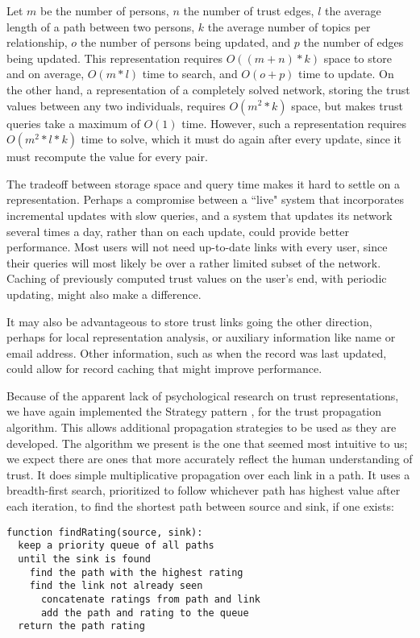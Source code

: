 \documentclass[letterpaper]{www2006-submission}
\begin{document}
Let $m$ be the number of persons, $n$ the number of trust edges, $l$ the average length of a path between two persons, $k$ the average number of topics per relationship, $o$ the number of persons being updated, and $p$ the number of edges being updated.  This representation requires $O((m+n)*k)$ space to store and on average, $O(m*l)$ time to search, and $O(o+p)$ time to update.  On the other hand, a representation of a completely solved network, storing the trust values between any two individuals, requires $O(m^2*k)$ space, but makes trust queries take a maximum of $O(1)$ time.  However, such a representation requires $O(m^2*l*k)$ time to solve, which it must do again after every update, since it must recompute the value for every pair.  

The tradeoff between storage space and query time makes it hard to settle on a representation.  Perhaps a compromise between a ``live" system that incorporates incremental updates with slow queries, and a system that updates its network several times a day, rather than on each update, could provide better performance.  Most users will not need up-to-date links with every user, since their queries will most likely be over a rather limited subset of the network.  Caching of previously computed trust values on the user's end, with periodic updating, might also make a difference.

It may also be advantageous to store trust links going the other direction, perhaps for local representation analysis, or auxiliary information like name or email address.  Other information, such as when the record was last updated, could allow for record caching that might improve performance.

Because of the apparent lack of psychological research on trust representations, we have again implemented the Strategy pattern \citep{designPatterns}, for the trust propagation algorithm.  This allows additional propagation strategies to be used as they are developed.  The algorithm we present is the one that seemed most intuitive to us; we expect there are ones that more accurately reflect the human understanding of trust. It does simple multiplicative propagation over each link in a path.  It uses a breadth-first search, prioritized to follow whichever path has highest value after each iteration, to find the shortest path between source and sink, if one exists:

\begin{verbatim}
function findRating(source, sink):
  keep a priority queue of all paths
  until the sink is found
    find the path with the highest rating
    find the link not already seen
      concatenate ratings from path and link
      add the path and rating to the queue
  return the path rating
\end{verbatim}
\end{document}
